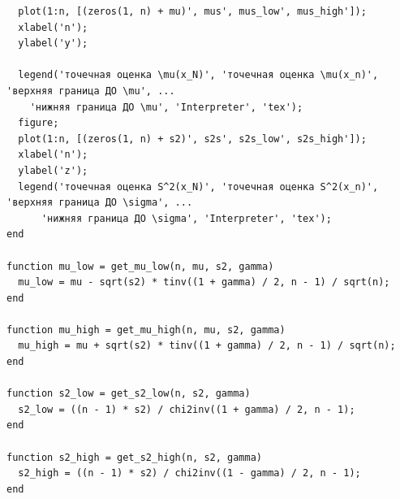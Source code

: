 \begin{lstlisting}
  plot(1:n, [(zeros(1, n) + mu)', mus', mus_low', mus_high']);
  xlabel('n');
  ylabel('y');

  legend('точечная оценка \mu(x_N)', 'точечная оценка \mu(x_n)', 'верхняя граница ДО \mu', ...
    'нижняя граница ДО \mu', 'Interpreter', 'tex');
  figure;
  plot(1:n, [(zeros(1, n) + s2)', s2s', s2s_low', s2s_high']);
  xlabel('n');
  ylabel('z');
  legend('точечная оценка S^2(x_N)', 'точечная оценка S^2(x_n)', 'верхняя граница ДО \sigma', ...
      'нижняя граница ДО \sigma', 'Interpreter', 'tex');
end

function mu_low = get_mu_low(n, mu, s2, gamma)
  mu_low = mu - sqrt(s2) * tinv((1 + gamma) / 2, n - 1) / sqrt(n);
end

function mu_high = get_mu_high(n, mu, s2, gamma)
  mu_high = mu + sqrt(s2) * tinv((1 + gamma) / 2, n - 1) / sqrt(n);
end

function s2_low = get_s2_low(n, s2, gamma)
  s2_low = ((n - 1) * s2) / chi2inv((1 + gamma) / 2, n - 1);
end

function s2_high = get_s2_high(n, s2, gamma)
  s2_high = ((n - 1) * s2) / chi2inv((1 - gamma) / 2, n - 1);
end
\end{lstlisting}
